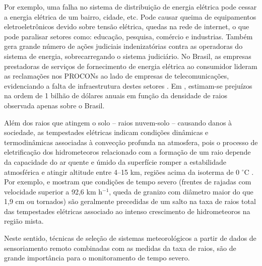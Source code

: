 Por exemplo, uma falha no sistema de distribuição de energia elétrica pode cessar a energia elétrica de um bairro, cidade, etc. Pode causar queima de equipamentos eletroeletrônicos devido sobre tensão elétrica, quedas na rede de internet, o que pode paralisar  setores como: educação, pesquisa, comércio e industrias. Também gera grande número de ações judiciais indenizatórias contra as operadoras do sistema de energia, sobrecarregando o sistema judiciário. No Brasil, as empresas prestadoras de serviços de fornecimento de energia elétrica ao consumidor lideram as reclamações nos PROCONs ao lado de empresas de telecomunicações, evidenciando a falta de infraestrutura destes setores \cite{noticiaG1tempestade, noticiaG1levantamento, noticiaFolha, noticiaFolhaRaio, rankinProcon}. Em , estimam-se prejuízos na ordem de 1 bilhão de dólares anuais em função da densidade de raios observada apenas sobre o Brasil. 
      

Além dos raios que atingem o solo -- raios nuvem-solo -- causando danos à sociedade, as tempestades elétricas indicam condições dinâmicas e termodinâmicas associadas à convecção profunda na atmosfera, pois o processo de eletrificação dos hidrometeoros relacionado com a formação de um raio depende da capacidade do ar quente e úmido da superfície romper a estabilidade atmosférica e atingir altitude entre 4--15 km, regiões acima da isoterma de 0 $^{\circ}$C \cite{doswell2001,zipser2006}. Por exemplo,    e  mostram que condições de tempo severo (frentes de rajadas com velocidade superior a 92,6 km h$^{-1}$, queda de granizo com diâmetro maior do que 1,9 cm ou tornados) são geralmente precedidas de um salto na taxa de raios total das tempestades elétricas associado ao intenso crescimento de hidrometeoros na região mista.      

Neste sentido, técnicas de seleção de sistemas meteorológicos a partir de dados de sensoriamento remoto combinadas com as medidas da taxa de raios, são de grande importância para o monitoramento de tempo severo. 

